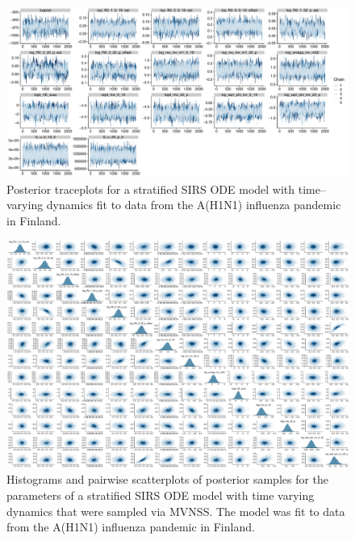 \begin{figure}
	\centering
	\includegraphics[width=\linewidth]{figures/flu_traces_rw_ode}
	\caption{Posterior traceplots for a stratified SIRS ODE model with time--varying dynamics fit to data from the A(H1N1) influenza pandemic in Finland.}
	\label{fig:flutracesrwode}
\end{figure}

\begin{figure}
	\centering
	\includegraphics[width=\linewidth]{figures/flu_rw_pairs}
	\caption[Histograms and pairwise scatterplots of posterior samples of the parameters from a stratified SIRS ODE model with time varying dynamics fit to data from the A(H1N1) influenza pandemic in Finland.]{Histograms and pairwise scatterplots of posterior samples for the parameters of a stratified SIRS ODE model with time varying dynamics that were sampled via MVNSS. The model was fit to data from the A(H1N1) influenza pandemic in Finland.}
	\label{fig:flurwpairs}
\end{figure}

